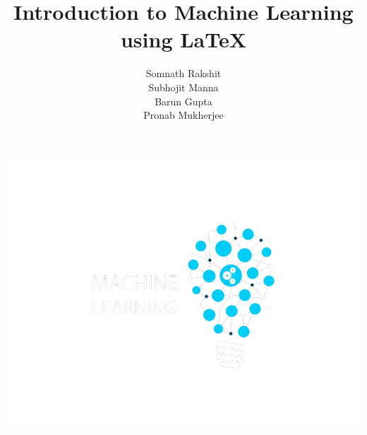 \documentclass[10pt]{beamer}
\begin{document}
\author[Group 9]{Somnath Rakshit\\Subhojit Manna\\Barun Gupta\\Pronab Mukherjee}
\title[Machine Learning]{Introduction to Machine Learning using \LaTeX}


\begingroup
{}
\begin{frame}[plain,t]
\hspace*{-22 mm}
\includegraphics[width=\paperwidth,height=\paperheight]{images/ml_bg}
\end{frame}
\endgroup
\end{document}
